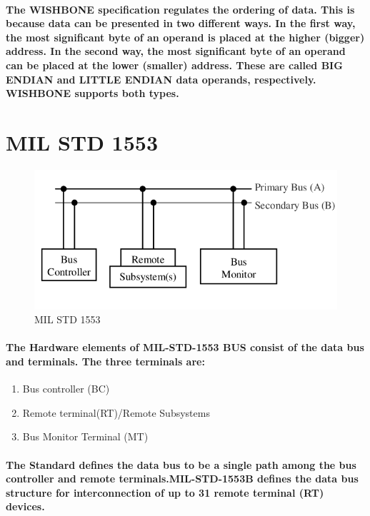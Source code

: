 \documentclass[12pt,a4paper]{report}
\begin{document}
\paragraph{\textrm{\textmd {The WISHBONE specification regulates the ordering of data. This is because data can be presented in two different ways. In the first way, the most significant byte of an operand is placed
at the higher (bigger) address. In the second way, the most significant byte of an operand can be
placed at the lower (smaller) address. These are called BIG ENDIAN and LITTLE ENDIAN
data operands, respectively. WISHBONE supports both types.  }}}
\section{MIL STD 1553}
\begin{figure}[h]
	\centering
	\includegraphics[scale=.4]{1553.png}
	\caption{MIL STD 1553}
	\label{fig:1553}
\end{figure}
\paragraph{\textrm{\textmd{The Hardware elements of	MIL-STD-1553 BUS consist of the data bus and terminals. The three terminals are:}}}
\begin{enumerate}
	\item Bus controller (BC)
	\item Remote terminal(RT)/Remote Subsystems
	\item Bus Monitor Terminal (MT)
\end{enumerate} 
\paragraph{\textrm{\textmd{The Standard defines the data bus to be a single path among the bus controller and remote terminals.MIL-STD-1553B defines the data bus structure for interconnection of up to 31 remote terminal (RT) devices.}}}
\end{document}
